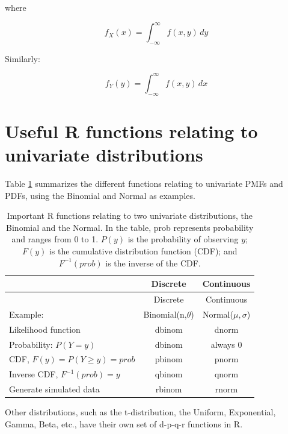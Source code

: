 \documentclass[
  12pt,
]{krantz}
\theoremstyle{definition}
\theoremstyle{definition}
\theoremstyle{definition}
\theoremstyle{definition}
\theoremstyle{remark}
\begin{document}
\begin{blackbox}
\noindent
where

\begin{equation}
f_X(x) = \int_{-\infty}^{\infty} f(x,y)\, dy    
\end{equation}

Similarly:

\begin{equation}
f_Y(y) =  \int_{-\infty}^{\infty} f(x,y)\, dx       
\end{equation}

\end{blackbox}

\hypertarget{useful-r-functions-relating-to-univariate-distributions}{%
\section{Useful R functions relating to univariate distributions}\label{useful-r-functions-relating-to-univariate-distributions}}

Table \ref{tab:dpqrfunctions} summarizes the different functions relating to univariate PMFs and PDFs, using the Binomial and Normal as examples.

\begin{longtable}[]{@{}lcc@{}}
\caption{\label{tab:dpqrfunctions} Important R functions relating to two univariate distributions, the Binomial and the Normal. In the table, prob represents probability and ranges from 0 to 1. \(P(y)\) is the probability of observing \(y\); \(F(y)\) is the cumulative distribution function (CDF); and \(F^{-1}(prob)\) is the inverse of the CDF.}\tabularnewline
\toprule()
& Discrete & Continuous \\
\midrule()
\endfirsthead
\toprule()
& Discrete & Continuous \\
\midrule()
\endhead
Example: & Binomial(n,\(\theta\)) & Normal(\(\mu,\sigma\)) \\
Likelihood function & dbinom & dnorm \\
Probability: \(P(Y=y)\) & dbinom & always 0 \\
CDF, \(F(y)=P(Y\geq y)=prob\) & pbinom & pnorm \\
Inverse CDF, \(F^{-1}(prob)=y\) & qbinom & qnorm \\
Generate simulated data & rbinom & rnorm \\
\bottomrule()
\end{longtable}

Other distributions, such as the t-distribution, the Uniform, Exponential, Gamma, Beta, etc., have their own set of d-p-q-r functions in R.
\end{document}
